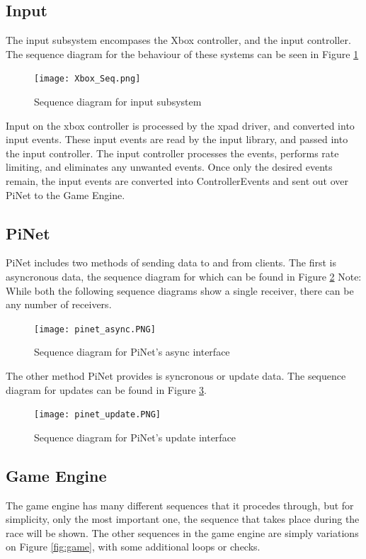 \documentclass[letterpaper,fleqn]{article}
\begin{document}
\subsection{Input}
The input subsystem encompases the Xbox controller, and the input controller. The sequence diagram for the behaviour of these systems can be seen in Figure \ref{fig:xbox_seq}

\begin{figure}[H]
\centering
\texttt{[image: Xbox\_Seq.png]}
\caption{Sequence diagram for input subsystem}
\label{fig:xbox_seq}
\end{figure}

Input on the xbox controller is processed by the xpad driver, and converted into input events. These input events are read by the input library, and passed into the input controller. The input controller processes the events, performs rate limiting, and eliminates any unwanted events. Once only the desired events remain, the input events are converted into ControllerEvents and sent out over PiNet to the Game Engine.

\subsection{PiNet}
PiNet includes two methods of sending data to and from clients. The first is asyncronous data, the sequence diagram for which can be found in Figure \ref{fig:pinet_async}
Note: While both the following sequence diagrams show a single receiver, there can be any number of receivers.

\begin{figure}[H]
\centering
\texttt{[image: pinet\_async.PNG]}
\caption{Sequence diagram for PiNet's async interface}
\label{fig:pinet_async}
\end{figure}

The other method PiNet provides is syncronous or update data. The sequence diagram for updates can be found in Figure \ref{fig:pinet_update}.

\begin{figure}[H]
\centering
\texttt{[image: pinet\_update.PNG]}
\caption{Sequence diagram for PiNet's update interface}
\label{fig:pinet_update}
\end{figure}

\subsection{Game Engine}
The game engine has many different sequences that it procedes through, but for simplicity, only the most important one, the sequence that takes place during the race will be shown. The other sequences in the game engine are simply variations on Figure \ref{fig:game}, with some additional loops or checks.
\end{document}
